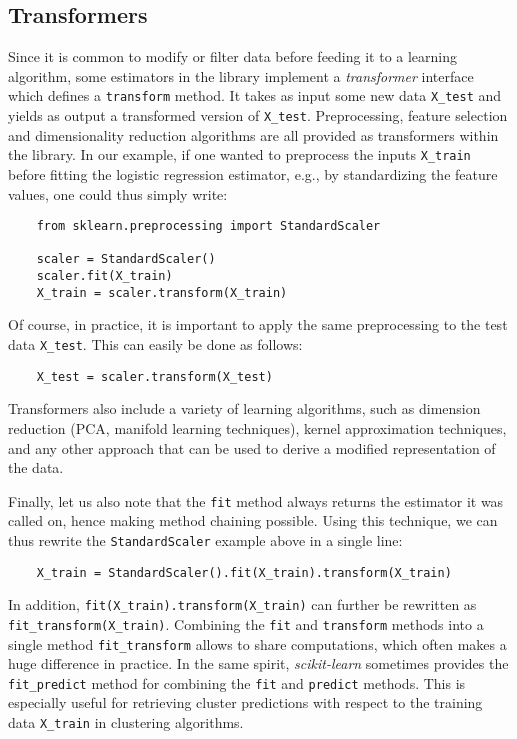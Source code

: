 \documentclass{llncs}
\newcommand{\sklearn}{\textit{scikit-learn}\xspace}
\begin{document}
\subsection{Transformers}

Since it is common to modify or filter data before feeding it to a learning
algorithm, some estimators in the library implement a \textit{transformer}
interface which defines a \texttt{transform} method. It takes as input some new
data \texttt{X\_test} and yields as output a transformed version of
\texttt{X\_test}. Preprocessing, feature selection and dimensionality reduction
algorithms are all provided as transformers within the library.  In our example,
if one wanted to preprocess the inputs \texttt{X\_train} before fitting the
logistic regression estimator, e.g., by standardizing the feature values, one
could thus simply write:
\begin{verbatim}
    from sklearn.preprocessing import StandardScaler

    scaler = StandardScaler()
    scaler.fit(X_train)
    X_train = scaler.transform(X_train)
\end{verbatim}
Of course, in practice, it is important to apply the same preprocessing to the
test data \texttt{X\_test}. This can easily be done as follows:
\begin{verbatim}
    X_test = scaler.transform(X_test)
\end{verbatim}
Transformers also include a variety of learning algorithms, such as
dimension reduction (PCA, manifold learning techniques), kernel
approximation techniques, and any other approach that can be used to
derive a modified representation of the data.

Finally, let us also note that the \texttt{fit} method always returns the estimator
it was called on, hence making method chaining possible.  Using this technique,
we can thus rewrite the \texttt{StandardScaler} example above in a single line:
\begin{verbatim}
    X_train = StandardScaler().fit(X_train).transform(X_train)
\end{verbatim}
In addition, \texttt{fit(X\_train).transform(X\_train)} can further
be rewritten as \texttt{fit\_transform(X\_train)}.  Combining the \texttt{fit}
and \texttt{transform} methods into a single method \texttt{fit\_transform}
allows to share computations, which often makes a huge difference in practice.
In the same spirit, \sklearn sometimes provides the
\texttt{fit\_predict} method for combining the \texttt{fit} and \texttt{predict}
methods. This is especially useful for retrieving cluster predictions with
respect to the training data \texttt{X\_train} in clustering algorithms.
\end{document}
